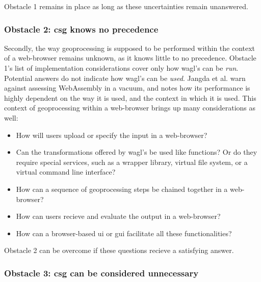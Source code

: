 Obstacle 1 remains in place as long as these uncertainties remain unanswered. 

\subsubsection*{Obstacle 2: \ac{csg} knows no precedence}

Secondly, the way geoprocessing is supposed to be performed within the context of a web-browser remains unknown, as it knows little to no precedence. Obstacle 1's list of implementation considerations cover only how \ac{wagl}'s can be \emph{run}. Potential answers do not indicate how \ac{wagl}'s can be \emph{used}. Jangda et al. warn against assessing WebAssembly in a vacuum, and notes how its performance is highly dependent on the way it is used, and the context in which it is used. This context of geoprocessing within a web-browser brings up many considerations as well: 

\begin{itemize}
  \item How will users upload or specify the input in a web-browser?
  \item Can the transformations offered by \ac{wagl}'s be used like functions? Or do they require special services, such as a wrapper library, virtual file system, or a virtual command line interface? 
  \item How can a sequence of geoprocessing steps be chained together in a web-browser?
  \item How can users recieve and evaluate the output in a web-browser?
  \item How can a browser-based \ac{ui} or \ac{gui} facilitate all these functionalities?
\end{itemize}

Obstacle 2 can be overcome if these questions recieve a satisfying answer. 

\subsubsection*{Obstacle 3: \ac{csg} can be considered unnecessary}

